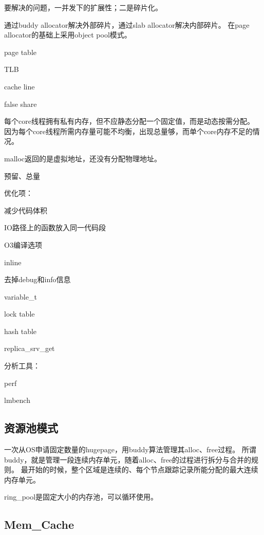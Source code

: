 要解决的问题，一并发下的扩展性；二是碎片化。

通过buddy allocator解决外部碎片，通过slab allocator解决内部碎片。
在page allocator的基础上采用object pool模式。

\begin{enumbox}
\item page table
\item TLB
\item cache line
\item false share
\end{enumbox}

每个core线程拥有私有内存，但不应静态分配一个固定值，而是动态按需分配。
因为每个core线程所需内存量可能不均衡，出现总量够，而单个core内存不足的情况。

malloc返回的是虚拟地址，还没有分配物理地址。

预留、总量

优化项：
\begin{enumbox}
\item 减少代码体积
\item IO路径上的函数放入同一代码段
\item O3编译选项
\item inline
\item 去掉debug和info信息
\item variable\_t
\item lock table
\item hash table
\item replica\_srv\_get
\end{enumbox}

分析工具：
\begin{enumbox}
\item perf
\item lmbench
\end{enumbox}

\subsection{资源池模式}

一次从OS申请固定数量的hugepage，用buddy算法管理其alloc、free过程。
所谓buddy，就是管理一段连续内存单元，随着alloc、free的过程进行拆分与合并的规则。
最开始的时候，整个区域是连续的、每个节点跟踪记录所能分配的最大连续内存单元。

ring\_pool是固定大小的内存池，可以循环使用。

\subsection{Mem\_Cache}

